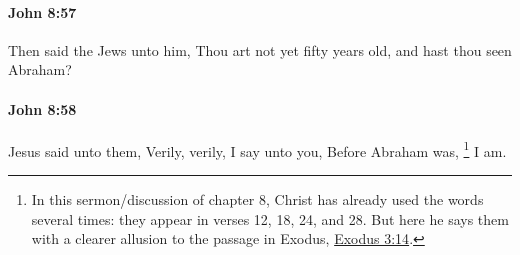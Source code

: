 		\paragraph{John 8:57} %
			\label{JOHN-8-57}

			Then said the Jews unto him, Thou art not yet fifty years old, and hast thou seen Abraham?

			\begin{framed}
				\scriptsize
				\begin{compactdesc}
					\item[SBLG] 
				\end{compactdesc}
			\end{framed}

		\paragraph{John 8:58} %
			\label{JOHN-8-58}

			Jesus said unto them, Verily, verily, I say unto you, Before Abraham was,
				\footnote{%
					In this sermon/discussion of chapter 8, Christ has already used the words  several times: they appear in verses 12, 18, 24, and 28. But here he says them with a clearer allusion to the passage in Exodus, \hyperref[EXODUS-3-14]{Exodus 3:14}.
					}
			I am.

